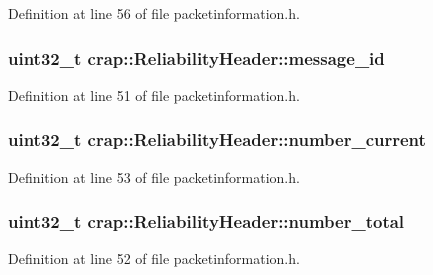 Definition at line 56 of file packetinformation.\+h.

\hypertarget{structcrap_1_1_reliability_header_ae57dee1a462c80b641089b15f26fa8f6}{}
\subsubsection[{message\+\_\+id}]{\setlength{\rightskip}{0pt plus 5cm}uint32\+\_\+t crap\+::\+Reliability\+Header\+::message\+\_\+id}\label{structcrap_1_1_reliability_header_ae57dee1a462c80b641089b15f26fa8f6}


Definition at line 51 of file packetinformation.\+h.

\hypertarget{structcrap_1_1_reliability_header_acef2cb3ff99e0229f478a1cfe800e3c2}{}
\subsubsection[{number\+\_\+current}]{\setlength{\rightskip}{0pt plus 5cm}uint32\+\_\+t crap\+::\+Reliability\+Header\+::number\+\_\+current}\label{structcrap_1_1_reliability_header_acef2cb3ff99e0229f478a1cfe800e3c2}


Definition at line 53 of file packetinformation.\+h.

\hypertarget{structcrap_1_1_reliability_header_a75c2c46f6518e8594841091ad2d0e574}{}
\subsubsection[{number\+\_\+total}]{\setlength{\rightskip}{0pt plus 5cm}uint32\+\_\+t crap\+::\+Reliability\+Header\+::number\+\_\+total}\label{structcrap_1_1_reliability_header_a75c2c46f6518e8594841091ad2d0e574}


Definition at line 52 of file packetinformation.\+h.

\hypertarget{structcrap_1_1_reliability_header_affcfb76dc5c78fb16f7c6ebf79477ea5}{}
